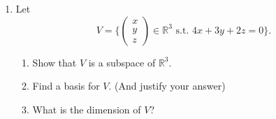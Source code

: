 \documentclass{article}
\begin{document}
\begin{enumerate}
\newpage
\item Let  \[ V = \{ \begin{pmatrix} x \\ y \\ z \end{pmatrix}\in \mathbb{R}^3 \text{ s.t. } 4x+3y+2z =0\}.\]
\begin{enumerate}
\item Show that $V$ is a subspace of $\mathbb{R}^3$.
\item Find a basis for $V$. (And justify your answer)
\item What is the dimension of $V$?
\end{enumerate}

	\thispagestyle{empty}

	\thispagestyle{empty}
\end{enumerate}
\end{document}
